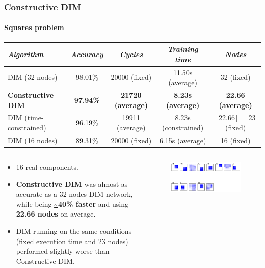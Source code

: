\documentclass{beamer}
\begin{document}
			\begin{frame}
				\frametitle{Constructive DIM}
				\framesubtitle{Squares problem}
\begin{table}[h]
	\centering
	\begin{adjustbox}{width=1\textwidth}
		\begin{tabular}{l*{4}{|c}}
			\emph{Algorithm}          & \emph{Accuracy}  & \emph{Cycles}            & \emph{Training time}     & \emph{Nodes}                       \\
			\hline
			DIM (32 nodes)            & 98.01\%          & 20000 (fixed)            & 11.50s (average)         & 32 (fixed)                         \\
			\textbf{Constructive DIM} & \textbf{97.94\%} & \textbf{21720 (average)} & \textbf{8.23s (average)} & \textbf{22.66 (average)}           \\
			DIM (time-constrained)    & 96.19\%          & 19911 (average)          & 8.23s (constrained)      & $\lceil$22.66$\rceil$ = 23 (fixed) \\
			DIM (16 nodes)            & 89.31\%          & 20000 (fixed)            & 6.15s (average)         & 16 (fixed)                          \\
		\end{tabular}
	\end{adjustbox}
\end{table}
				\begin{columns}[c]
						\begin{small}
							\begin{itemize}
								\item 16 real components.
								\item \textbf{Constructive DIM} was almost as accurate as a 32 nodes DIM network, while being \textbf{\url{~}40\% faster} and using \textbf{22.66 nodes} on average.
								\item DIM running on the same conditions (fixed execution time and 23 nodes) performed slightly worse than Constructive DIM.
							\end{itemize}
						\end{small}
						\begin{figure}[h]
							\centering
							\includegraphics[width=\textwidth]{learning_squares}
						\end{figure}
				\end{columns}
			\end{frame}
			
\end{document}
